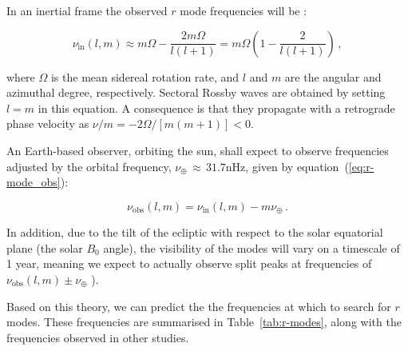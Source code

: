 In an inertial frame the observed $r$ mode frequencies will be \citep{lanza_sectoral_2019}:

\begin{equation}
\nu_{\mathrm{in}}(l,m) \approx m\Omega - \frac{2m\Omega}{l(l + 1)}  = m\Omega \left(1 - \frac{2}{l(l + 1)}\right) \, ,
\label{eq:r-mode}
\end{equation}

where $\Omega$ is the mean sidereal rotation rate, and $l$ and $m$ are the angular and azimuthal degree, respectively. Sectoral Rossby waves are obtained by setting $l=m$ in this equation. A consequence is that they propagate with a retrograde phase velocity as $\nu / m = -2 \Omega/[m(m + 1)] < 0$.

An Earth-based observer, orbiting the sun, shall expect to observe frequencies adjusted by the orbital frequency, $\nu_\oplus \, \approx \, 31.7$nHz, given by equation~(\ref{eq:r-mode_obs}):

\begin{equation}
\nu_{\mathrm{obs}}(l,m) = \nu_{\mathrm{in}}(l,m) - m\nu_{\oplus} \, .
\label{eq:r-mode_obs}
\end{equation}

In addition, due to the tilt of the ecliptic with respect to the solar equatorial plane (the solar $B_0$ angle), the visibility of the modes will vary on a timescale of 1 year, meaning we expect to actually observe split peaks at frequencies of $\nu_{\mathrm{obs}}(l,m) \pm \nu_{\oplus}$ \citep{lanza_sectoral_2019}).

Based on this theory, we can predict the the frequencies at which to search for $r$ modes. These frequencies are summarised in Table~\ref{tab:r-modes}, along with the frequencies observed in other studies. %

